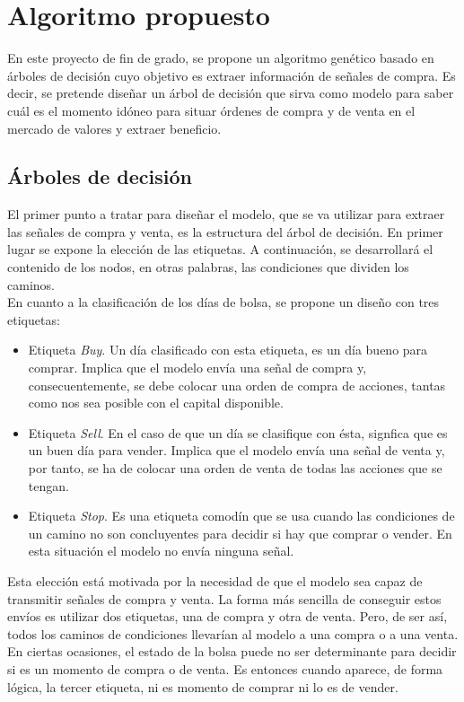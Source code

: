 \section{Algoritmo propuesto}\label{sec:algorithm}

En este proyecto de fin de grado, se propone un algoritmo gen\'etico basado en \'arboles de decisi\'on cuyo objetivo es extraer informaci\'on de se\~nales de compra. Es decir, se pretende dise\~nar un \'arbol de decisi\'on que sirva como modelo para saber cu\'al es el momento id\'oneo para situar \'ordenes de compra y de venta en el mercado de valores y extraer beneficio.\\

\subsection{\'Arboles de decisi\'on}
El primer punto a tratar para dise\~nar el modelo, que se va  utilizar para extraer las se\~nales de compra y venta, es la estructura del \'arbol de decisi\'on. En primer lugar se expone la elecci\'on de las etiquetas. A continuaci\'on, se desarrollar\'a el contenido de los nodos, en otras palabras, las condiciones que dividen los caminos.\\

En cuanto a la clasificaci\'on de los d\'ias de bolsa, se propone un dise\~no con tres etiquetas:
\begin{itemize}
    \item Etiqueta \textit{Buy}. Un d\'ia clasificado con esta etiqueta, es un d\'ia bueno para comprar. Implica que el modelo env\'ia una se\~nal de compra y, consecuentemente, se debe colocar una orden de compra de acciones, tantas como nos sea posible con el capital disponible.
    \item Etiqueta \textit{Sell}. En el caso de que un d\'ia se clasifique con \'esta, signfica que es un buen d\'ia para vender. Implica que el modelo env\'ia una se\~nal de venta y, por tanto, se ha de colocar una orden de venta de todas las acciones que se tengan.
    \item Etiqueta \textit{Stop}. Es una etiqueta comod\'in que se usa cuando las condiciones de un camino no son concluyentes para decidir si hay que comprar o vender. En esta situaci\'on el modelo no env\'ia ninguna se\~nal.
\end{itemize}

Esta elecci\'on est\'a motivada por la necesidad de que el modelo sea capaz de transmitir se\~nales de compra y venta. La forma m\'as sencilla de conseguir estos env\'ios es utilizar dos etiquetas, una de compra y otra de venta. Pero, de ser as\'i, todos los caminos de condiciones llevar\'ian al modelo a una compra o a una venta. En ciertas ocasiones, el estado de la bolsa puede no ser determinante para decidir si es un momento de compra o de venta. Es entonces cuando aparece, de forma l\'ogica, la tercer etiqueta, ni es momento de comprar ni lo es de vender. \\

